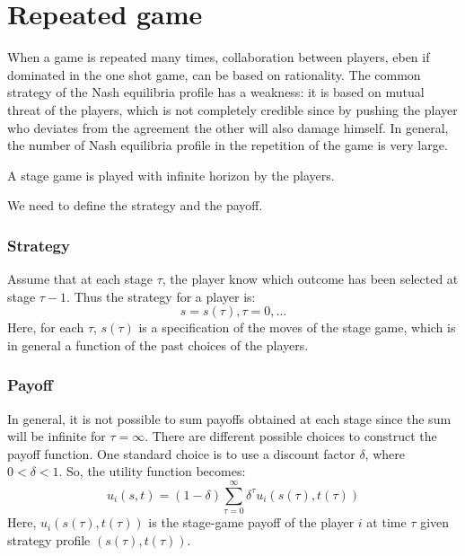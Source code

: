 \section{Repeated game}

When a game is repeated many times, collaboration between players, eben if dominated in the one shot game, can be based on rationality. 
The common strategy of the Nash equilibria profile has a weakness: it is based on mutual threat of the players, which is not completely credible since by pushing the player who deviates from the agreement the other will also damage himself. 
In general, the number of Nash equilibria profile in the repetition of the game is very large. 

\begin{definition}
    A stage game is played with infinite horizon by the players.
\end{definition}
\noindent We need to define the strategy and the payoff. 

\subsubsection{Strategy}
Assume that at each stage $\tau$, the player know which outcome has been selected at stage $\tau-1$.
Thus the strategy for a player is: 
\[s=s(\tau),\tau=0,\dots\]
\noindent Here, for each $\tau$, $s(\tau)$ is a specification of the moves of the stage game, which is in general a function of the past choices of the players.

\subsubsection{Payoff}
In general, it is not possible to sum payoffs obtained at each stage since the sum will be infinite for $\tau=\infty$.
There are different possible choices to construct the payoff function.
One standard choice is to use a discount factor $\delta$, where $0<\delta < 1$. 
So, the utility function becomes: 
\[u_i(s,t)=(1-\delta)\sum_{\tau=0}^{\infty}\delta^\tau u_i(s(\tau),t(\tau))\]
Here,  $u_i(s(\tau),t(\tau))$ is the stage-game payoff of the player $i$ at time $\tau$ given strategy profile $(s(\tau),t(\tau))$. 

